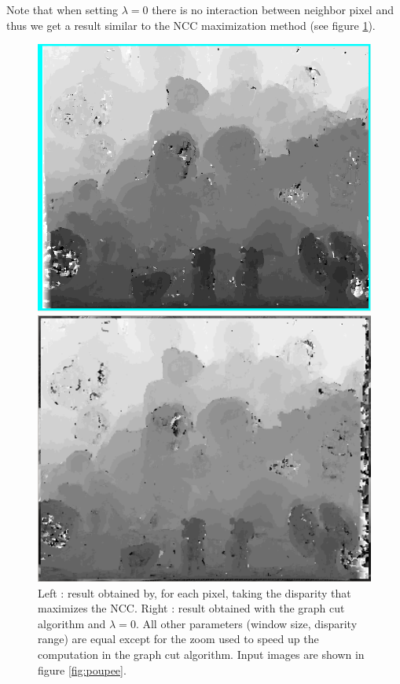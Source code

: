 \documentclass[]{article}
\begin{document}
Note that when setting $\lambda=0$ there is no interaction between neighbor pixel and thus we get a result similar to the NCC maximization method (see figure \ref{fig:lambda0}).
\begin{figure}[h]
	\centering
	\begin{minipage}{0.47\linewidth}
		\includegraphics[width=\linewidth]{results/poup_full_monasse.png}
	\end{minipage}\hfill
	\begin{minipage}{0.47\linewidth}
		\includegraphics[width=\linewidth]{results/poup_l0_gc.png}
	\end{minipage}
	\caption{Left : result obtained by, for each pixel, taking the disparity that maximizes the NCC. Right : result obtained with the graph cut algorithm and $\lambda=0$. All other parameters (window size, disparity range) are equal except for the zoom used to speed up the computation in the graph cut algorithm. Input images are shown in figure \ref{fig:poupee}.}
	\label{fig:lambda0}
\end{figure}
\end{document}
